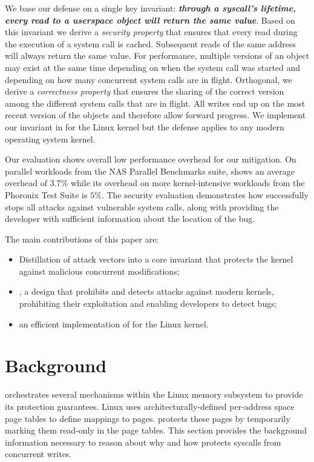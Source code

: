 \documentclass[letterpaper,twocolumn,10pt, anonymous]{article}
\begin{document}
We base our defense on a single key invariant: 
\textbf{\emph{through a syscall's lifetime, every read to a userspace object 
will return the same value}}. Based on this invariant we derive a \emph{security
property} that ensures that every read during the execution of a system call is
cached. Subsequent reads of the same address will always return the same value.
For performance, multiple versions of an object may exist at the same time
depending on when the system call was started and depending on how many
concurrent system calls are in flight. Orthogonal, we derive a \emph{correctness
property} that ensures the sharing of the correct version among the different
system calls that are in flight. All writes end up on the most recent version of
the objects and therefore allow forward progress.
We implement our invariant in \tiktok for the Linux kernel but the defense
applies to any modern operating system kernel.

Our evaluation shows overall low performance overhead for our mitigation.
On parallel workloads from the NAS Parallel Benchmarks suite, \tiktok shows 
an average overhead of $3.7\%$ while its overhead on more kernel-intensive 
workloads from the Phoronix Test Suite is $5\%$.
The security evaluation demonstrates how \tiktok successfully stops all attacks
against vulnerable system calls, along with providing the developer with
sufficient information about the location of the bug.

The main contributions of this paper are:

\begin{itemize}
\item Distillation of \tocttou attack vectors into a core invariant that protects
the kernel against malicious concurrent modifications;
\item \tiktok, a design that prohibits and detects
\tocttou attacks against modern kernels, prohibiting their exploitation and
enabling developers to detect \tocttou bugs;
\item an efficient implementation of \tiktok for the Linux kernel.
\end{itemize}


\section{Background}

\tiktok orchestrates several mechanisms within the Linux memory subsystem 
to provide its protection guarantees.
Linux uses architecturally-defined per-address space page tables to define
mappings to pages.
\tiktok protects these pages by temporarily marking them read-only in the 
page tables.
This section provides the background information necessary to reason about 
why and how \tiktok protects syscalls from concurrent writes.
\end{document}
